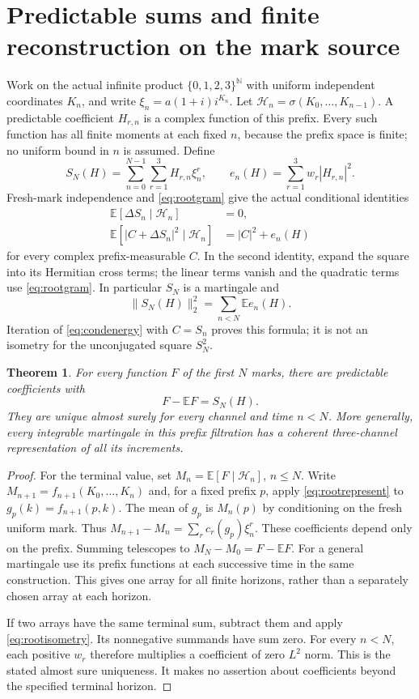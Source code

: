 \documentclass[11pt]{article}
\newtheorem{theorem}{Theorem}[section]
\newcommand{\E}{\mathbb E}\newcommand{\Pp}{\mathbb P}
\begin{document}
\section{Predictable sums and finite reconstruction on the mark source}
Work on the actual infinite product $\{0,1,2,3\}^{\mathbb N}$ with
uniform independent coordinates $K_n$, and write $\xi_n=a(1+i)i^{K_n}$.
Let $\mathcal H_n=\sigma(K_0,\ldots,K_{n-1})$. A predictable coefficient
$H_{r,n}$ is a complex function of this prefix. Every such function
has all finite moments at each fixed $n$, because the prefix space is
finite; no uniform bound in $n$ is assumed. Define
\[
 S_N(H)=\sum_{n=0}^{N-1}\sum_{r=1}^3H_{r,n}\xi_n^r,
 \qquad e_n(H)=\sum_{r=1}^3w_r|H_{r,n}|^2.
\]
Fresh-mark independence and \eqref{eq:rootgram} give the actual
conditional identities
\begin{align}
 \E[\Delta S_n\mid\mathcal H_n]&=0,\label{eq:condcenter}\\
 \E[|C+\Delta S_n|^2\mid\mathcal H_n]
 &=|C|^2+e_n(H)\label{eq:condenergy}
\end{align}
for every complex prefix-measurable $C$. In the second identity, expand
the square into its Hermitian cross terms; the linear terms vanish and
the quadratic terms use \eqref{eq:rootgram}. In particular $S_N$ is a
martingale and
\begin{equation}\label{eq:rootisometry}
 \|S_N(H)\|_2^2=\sum_{n<N}\E e_n(H).
\end{equation}
Iteration of \eqref{eq:condenergy} with $C=S_n$ proves this formula;
it is not an isometry for the unconjugated square $S_N^2$.

\begin{theorem}\label{thm:finiteclark}
For every function $F$ of the first $N$ marks, there are predictable
coefficients with
\[
 F-\E F=S_N(H).
\]
They are unique almost surely for every channel and time $n<N$.
More generally, every integrable martingale in this prefix filtration
has a coherent three-channel representation of all its increments.
\end{theorem}
\begin{proof}
For the terminal value, set $M_n=\E[F\mid\mathcal H_n]$, $n\le N$.
Write $M_{n+1}=f_{n+1}(K_0,\ldots,K_n)$ and, for a fixed prefix $p$,
apply \eqref{eq:rootrepresent} to $g_p(k)=f_{n+1}(p,k)$.
The mean of $g_p$ is $M_n(p)$ by conditioning on the fresh uniform mark.
Thus $M_{n+1}-M_n=\sum_r c_r(g_p)\xi_n^r$. These coefficients depend
only on the prefix. Summing telescopes to $M_N-M_0=F-\E F$.
For a general martingale use its prefix functions at each successive
time in the same construction. This gives one array for all finite
horizons, rather than a separately chosen array at each horizon.

If two arrays have the same terminal sum, subtract them and apply
\eqref{eq:rootisometry}. Its nonnegative summands have sum zero.
For every $n<N$, each positive $w_r$ therefore multiplies a coefficient
of zero $L^2$ norm. This is the stated almost sure uniqueness. It makes
no assertion about coefficients beyond the specified terminal horizon.
\end{proof}
\end{document}
